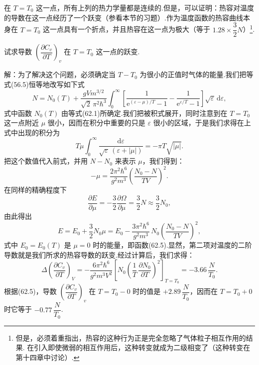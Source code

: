 在 $T=T_0$ 这一点，所有上列的热力学量都是连续的.但是，可以证明：热容对温度的导数在这一点经历了一个跃变（参看本节的习题）.作为温度函数的热容曲线本身在 $T=T_0$ 这一点具有一个折点，并且热容在这一点为极大（等于 $1.28\times\dfrac{3}{2}N$）\footnote{但是，必须着重指出，热容的这种行为正是完全忽略了气体粒子相互作用的结果. 在引入即使微弱的相互作用后，这种转变就成为二级相变了（这种转变在第十四章中讨论）.}.

\begin{xiti}

\quad 试求导数 $\left(\dfrac{\partial C_v}{\partial T}\right)_v$ 在 $T=T_0$ 这一点的跃变.

解：为了解决这个问题，必须确定当 $T-T_0$ 为很小的正值时气体的能量.我们把等式(56.5)恒等地改写如下式
\begin{equation*}
  N=N_0(T)+\frac{gVm^{3/2}}{\sqrt{2}\,\pi^2\hbar^3}\int_0^{\infty}
  \left[\frac{1}{\mathrm{e}^{(\varepsilon-\mu)/T}-1}
  -\frac{1}{\mathrm{e}^{\varepsilon/T}-1}\right]\sqrt{\varepsilon}\,\mathrm{d}\varepsilon,
\end{equation*}
式中函数 $N_0(T)$ 由等式(62.1)所确定.我们把被积式展开，同时注意到在 $T=T_0$ 这一点附近 $\mu$ 很小，因而在积分中重要的只是 $\varepsilon$ 很小的区域，于是我们求得在上式中出现的积分为
\begin{equation*}
  T\mu\int_0^{\infty}\frac{\mathrm{d}\varepsilon}{\sqrt{\varepsilon}\,(\varepsilon+|\mu|)}
  =-\pi T\sqrt{|\mu|}.
\end{equation*}
把这个数值代入前式，并用 $N-N_0$ 来表示 $\mu$，我们得到：
\begin{equation*}
  -\mu=\frac{2\pi^2\hbar^6}{g^2m^3}\left(\frac{N_0-N}{TV}\right)^2.
\end{equation*}
在同样的精确程度下
\begin{equation*}
  \frac{\partial E}{\partial\mu}=-\frac{3}{2}\frac{\partial\Omega}{\partial\mu}
  =\frac{3}{2}N\approx\frac{3}{2}N_0,
\end{equation*}
由此得出
\begin{equation*}
  E=E_0+\frac{3}{2}N_0\mu
  =E_0-\frac{3\pi^2\hbar^6}{g^2m^3}\,N_0\left(\frac{N_0-N}{TV}\right)^2,
\end{equation*}
式中 $E_0=E_0(T)$ 是 $\mu=0$ 时的能量，即函数(62.5).显然，第二项对温度的二阶导数就是我们所求的热容导数的跃变.经过计算后，我们求得：
\begin{equation*}
  \Delta\left(\frac{\partial C_v}{\partial T}\right)_V
  =-\frac{6\pi^2\hbar^6}{g^2m^3V^2}
  \left[N_0\left(\frac{1}{T}\,\frac{\partial N_0}{\partial T}\right)^2\right]_{T=T_0}
  =-3.66\,\frac{N}{T_0}.
\end{equation*}
根据(62.5)，导数 $\left(\dfrac{\partial C_v}{\partial T}\right)_v$ 在 $T=T_0-0$ 时的值是 $+2.89\,\dfrac{N}{T_0}$，因而在 $T=T_0+0$ 时它等于 $-0.77\,\dfrac{N}{T_0}$.

\end{xiti}

